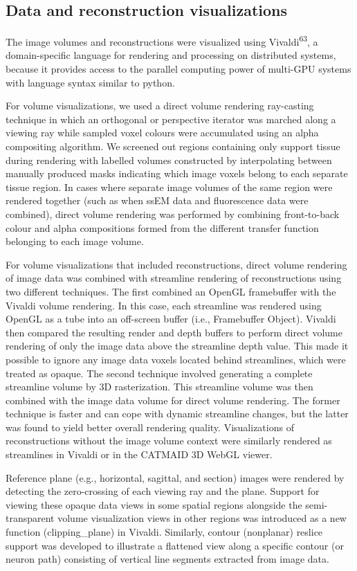 \documentclass{article}
\begin{document}
\subsection*{Data and reconstruction visualizations}


The image volumes and reconstructions were visualized using Vivaldi\textsuperscript{63}, a domain-specific language for rendering and processing on distributed systems, because it provides access to the parallel computing power of multi-GPU systems with language syntax similar to python.

For volume visualizations, we used a direct volume rendering ray-casting technique in which an orthogonal or perspective iterator was marched along a viewing ray while sampled voxel colours were accumulated using an alpha compositing algorithm. We screened out regions containing only support tissue during rendering with labelled volumes constructed by interpolating between manually produced masks indicating which image voxels belong to each separate tissue region. In cases where separate image volumes of the same region were rendered together (such as when ssEM data and fluorescence data were combined), direct volume rendering was performed by combining front-to-back colour and alpha compositions formed from the different transfer function belonging to each image volume.

For volume visualizations that included reconstructions, direct volume rendering of image data was combined with streamline rendering of reconstructions using two different techniques. The first combined an OpenGL framebuffer with the Vivaldi volume rendering. In this case, each streamline was rendered using OpenGL as a tube into an off-screen buffer (i.e., Framebuffer Object). Vivaldi then compared the resulting render and depth buffers to perform direct volume rendering of only the image data above the streamline depth value. This made it possible to ignore any image data voxels located behind streamlines, which were treated as opaque. The second technique involved generating a complete streamline volume by 3D rasterization. This streamline volume was then combined with the image data volume for direct volume rendering. The former technique is faster and can cope with dynamic streamline changes, but the latter was found to yield better overall rendering quality. Visualizations of reconstructions without the image volume context were similarly rendered as streamlines in Vivaldi or in the CATMAID 3D WebGL viewer.

Reference plane (e.g., horizontal, sagittal, and section) images were rendered by detecting the zero-crossing of each viewing ray and the plane. Support for viewing these opaque data views in some spatial regions alongside the semi-transparent volume visualization views in other regions was introduced as a new function (clipping\_plane) in Vivaldi. Similarly, contour (nonplanar) reslice support was developed to illustrate a flattened view along a specific contour (or neuron path) consisting of vertical line segments extracted from image data.
\end{document}
